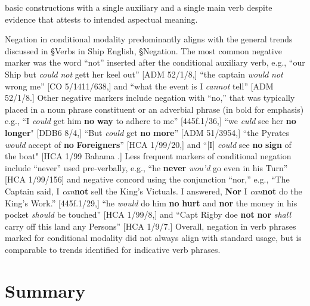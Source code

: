 basic constructions with a single auxiliary and a single main verb despite evidence that attests to intended aspectual meaning. 

  Negation in conditional modality predominantly aligns with the general trends discussed in §Verbs in Ship English, §Negation. The most common negative marker was the word “not” inserted after the conditional auxiliary verb, e.g., “our Ship but \textit{could} \textit{not} gett her keel out” [ADM 52/1/8,] “the captain \textit{would} \textit{not} wrong me” [CO 5/1411/638,] and “what the event is I \textit{cannot} tell” [ADM 52/1/8.] Other negative markers include negation with “no,” that was typically placed in a noun phrase constituent or an adverbial phrase (in bold for emphasis) e.g., “I \textit{could} get him \textbf{no} \textbf{way} to adhere to me” [445f.1/36,] “we \textit{culd} see her \textbf{no} \textbf{longer}" [DDB6 8/4,] “But \textit{could} get \textbf{no} \textbf{more}” [ADM 51/3954,] “the Pyrates \textit{would} accept of \textbf{no} \textbf{Foreigners}” [HCA 1/99/20,] and “[I] \textit{could} see \textbf{no} \textbf{sign} of the boat" [HCA 1/99 Bahama \citealt{Islands1722}.] Less frequent markers of conditional negation include “never” used pre-verbally, e.g., “he \textbf{never} \textit{wou’d} go even in his Turn” [HCA 1/99/156] and negative concord using the conjunction “nor,” e.g., “The Captain said, I \textit{can}\textbf{not} sell the King’s Victuals. I answered, \textbf{Nor} I \textit{can}\textbf{not} do the King’s Work.” [445f.1/29,] “he \textit{would} do him \textbf{no} \textbf{hurt} and \textbf{nor} the money in his pocket \textit{should} be touched” [HCA 1/99/8,] and “Capt Rigby doe \textbf{not} \textbf{nor} \textit{shall} carry off this land any Persons” [HCA 1/9/7.] Overall, negation in verb phrases marked for conditional modality did not always align with standard usage, but is comparable to trends identified for indicative verb phrases. 

\section{\textbf{Summary}}%

